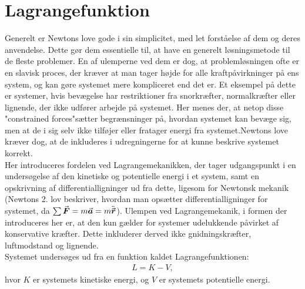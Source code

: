 \section{Lagrangefunktion}
Generelt er Newtons love gode i sin simplicitet, med let forståelse af dem og deres anvendelse. Dette gør dem essentielle til, at have en generelt løsningsmetode til de fleste problemer. En af ulemperne ved dem er dog, at problemløsningen ofte er en slavisk proces, der kræver at man tager højde for alle kraftpåvirkninger på ens system, og kan gøre systemet mere kompliceret end det er. Et eksempel på dette er systemer, hvis bevægelse har restriktioner fra snorkræfter, normalkræfter eller lignende, der ikke udfører arbejde på systemet. Her menes der, at netop disse "constrained forces"\;sætter begrænsninger på, hvordan systemet kan bevæge sig, men at de i sig selv ikke tilføjer eller fratager energi fra systemet.Newtons love kræver dog, at de inkluderes i udregningerne for at kunne beskrive systemet korrekt. \\

Her introduceres fordelen ved Lagrangemekanikken, der tager udgangspunkt i en undersøgelse af den kinetiske og potentielle energi i et system, samt en opskrivning af differentialligninger ud fra dette, ligesom for Newtonsk mekanik (Newtons 2. lov beskriver, hvordan man opsætter differentialligninger for systemet, da $\sum{\vec{\boldsymbol{F}}} = m{\vec{\boldsymbol{a}}} = m\ddot{{\vec{\boldsymbol{r}}}}$). Ulempen ved Lagrangemekanik, i formen der introduceres her er, at den kun gælder for systemer udelukkende påvirket af konservative kræfter. Dette inkluderer derved ikke gnidningskræfter, luftmodstand og lignende.  \\

\noindent Systemet undersøges ud fra en funktion kaldet Lagrangefunktionen:
\begin{align} \label{Lagrange_funktion}
	L = K - V,
\end{align}
hvor $K$ er systemets kinetiske energi, og $V$ er systemets potentielle energi.

